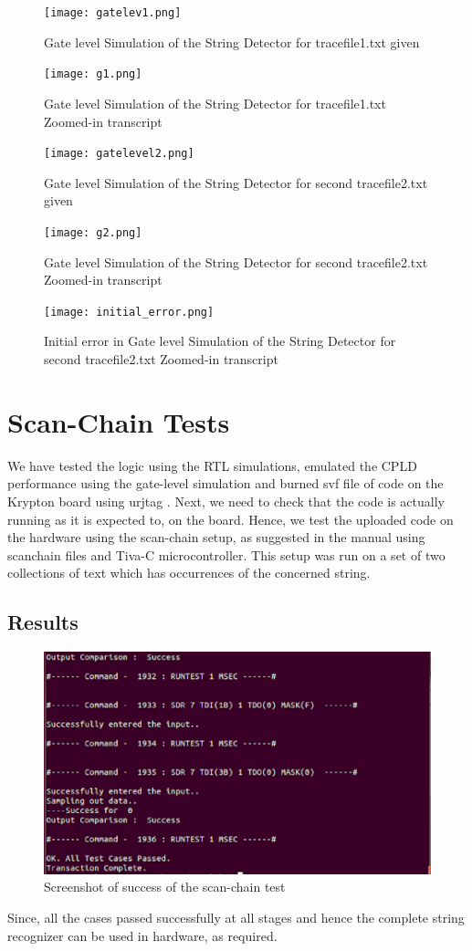 \documentclass[a4paper, 11pt]{article}
\begin{document}
\begin{figure}[H]
\centering
\texttt{[image: gatelev1.png]}
\caption{Gate level Simulation of the String Detector for tracefile1.txt given }
\end{figure}

\begin{figure}[H]
\centering
\texttt{[image: g1.png]}
\caption{Gate level Simulation of the String Detector for tracefile1.txt Zoomed-in transcript}
\end{figure} 

\begin{figure}[H]
\centering
\texttt{[image: gatelevel2.png]}
\caption{Gate level Simulation of the String Detector for second tracefile2.txt given }
\end{figure}

\begin{figure}[H]
\centering
\texttt{[image: g2.png]}
\caption{Gate level Simulation of the String Detector for second tracefile2.txt Zoomed-in transcript}
\end{figure} 

\begin{figure}[H]
\centering
\texttt{[image: initial\_error.png]}
\caption{Initial error in Gate level Simulation of the String Detector for second tracefile2.txt Zoomed-in transcript}
\end{figure}


\section{Scan-Chain Tests}

We have tested the logic using the RTL simulations, emulated the CPLD performance using the gate-level simulation and burned svf file of code on the Krypton board using urjtag . Next, we need to check that the code is actually running as it is expected to, on the board. 
Hence, we test the uploaded code on the hardware using the scan-chain setup, as suggested in the manual using scanchain files and Tiva-C microcontroller. This setup was run on a set of two collections of text which has occurrences of the concerned string.

\subsection*{Results}
\begin{figure}[H]
\centering
\includegraphics[scale=0.66]{scan_chain.png}
\caption{Screenshot of success of the scan-chain test}
\end{figure}

Since, all the cases passed successfully at all stages and hence the complete string recognizer can be used in hardware, as required.
\end{document}
